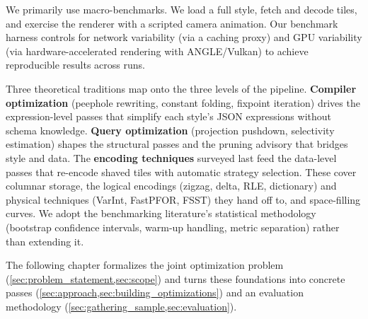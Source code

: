 \noindent We primarily use macro-benchmarks.
We load a full style, fetch and decode tiles, and exercise the renderer with a scripted camera animation.
Our benchmark harness controls for network variability (via a caching proxy) and \ac{GPU} variability (via hardware-accelerated rendering with ANGLE/Vulkan) to achieve reproducible results across runs.

\begin{chaptersummary}
Three theoretical traditions map onto the three levels of the pipeline.
\textbf{Compiler optimization} (peephole rewriting, constant folding, fixpoint iteration) drives the expression-level passes that simplify each style's \ac{JSON} expressions without schema knowledge.
\textbf{Query optimization} (projection pushdown, selectivity estimation) shapes the structural passes and the pruning advisory that bridges style and data.
The \textbf{encoding techniques} surveyed last feed the data-level passes that re-encode shaved tiles with automatic strategy selection.
These cover columnar storage, the logical encodings (zigzag, delta, \ac{RLE}, dictionary) and physical techniques (VarInt, FastPFOR, \ac{FSST}) they hand off to, and space-filling curves.
We adopt the benchmarking literature's statistical methodology (bootstrap confidence intervals, warm-up handling, metric separation) rather than extending it.

The following chapter formalizes the joint optimization problem (\cref{sec:problem_statement,sec:scope}) and turns these foundations into concrete passes (\cref{sec:approach,sec:building_optimizations}) and an evaluation methodology (\cref{sec:gathering_sample,sec:evaluation}).
\end{chaptersummary}
